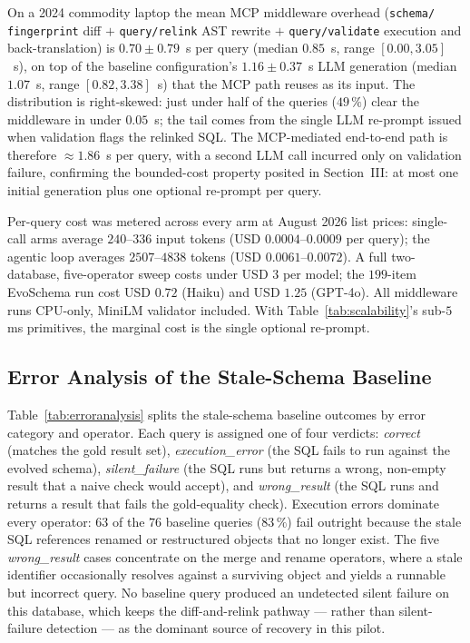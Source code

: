 \documentclass[conference,10pt,a4paper]{IEEEtran}
\begin{document}
On a 2024 commodity laptop the mean MCP middleware overhead
(\texttt{schema/} \texttt{fingerprint} diff $+$ \texttt{query/relink}
AST rewrite $+$ \texttt{query/validate} execution and back-translation)
is $0.70 \pm 0.79$~s per query (median $0.85$~s, range $[0.00, 3.05]$~s),
on top of the baseline configuration's $1.16 \pm 0.37$~s LLM generation
(median $1.07$~s, range $[0.82, 3.38]$~s) that the MCP path reuses as
its input. The distribution is right-skewed: just under half of the queries
($49\,\%$) clear the middleware in under $0.05$~s; the tail comes from
the single LLM re-prompt issued when validation flags the relinked SQL.
The MCP-mediated end-to-end path is therefore $\approx 1.86$~s per query,
with a second LLM call incurred only on validation failure,
confirming the bounded-cost property posited in Section~III: at most
one initial generation plus one optional re-prompt per query.

Per-query cost was metered across every arm at August 2026 list
prices: single-call arms average $240$--$336$ input tokens
(USD $0.0004$--$0.0009$ per query); the agentic loop averages
$2507$--$4838$ tokens (USD $0.0061$--$0.0072$). A full two-database,
five-operator sweep costs under USD $3$ per model; the $199$-item
EvoSchema run cost USD $0.72$ (Haiku) and USD $1.25$ (GPT-4o). All middleware runs CPU-only, MiniLM validator included. With
Table~\ref{tab:scalability}'s sub-$5$\,ms primitives, the marginal
cost is the single optional re-prompt.

\subsection{Error Analysis of the Stale-Schema Baseline}

Table~\ref{tab:erroranalysis} splits the stale-schema baseline
outcomes by error category and operator. Each query is assigned one of
four verdicts: \emph{correct} (matches the gold result set),
\emph{execution\_error} (the SQL fails to run against the evolved schema),
\emph{silent\_failure} (the SQL runs but returns a wrong, non-empty result
that a naive check would accept), and \emph{wrong\_result} (the SQL runs
and returns a result that fails the gold-equality check). Execution errors
dominate every operator: $63$ of the $76$ baseline queries ($83\,\%$) fail
outright because the stale SQL references renamed or restructured objects
that no longer exist. The five \emph{wrong\_result} cases concentrate on
the merge and rename operators, where a stale identifier occasionally
resolves against a surviving object and yields a runnable but incorrect
query. No baseline query produced an undetected silent failure on this
database, which keeps the diff-and-relink pathway --- rather than
silent-failure detection --- as the dominant source of recovery in this
pilot.
\end{document}
